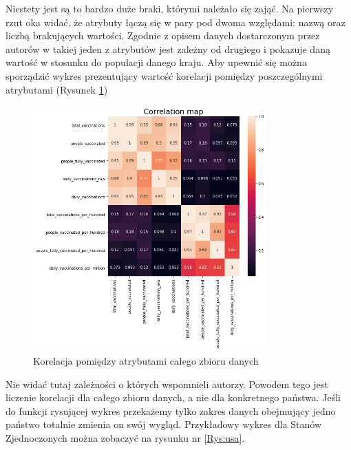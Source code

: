 \documentclass[12pt, oneside]{article}
\begin{document}
Niestety jest są to bardzo duże braki, którymi należało się zająć. Na pierwszy rzut oka widać, że atrybuty łączą się w pary pod dwoma względami: nazwą oraz liczbą brakujących wartości. Zgodnie z opisem danych dostarczonym przez autorów w takiej jeden z atrybutów jest zależny od drugiego i pokazuje daną wartość w stosunku do populacji danego kraju. Aby upewnić się można sporządzić wykres prezentujący wartość korelacji pomiędzy poszczególnymi atrybutami (Rysunek \ref{Rys:cor})

\begin{figure}[h]
\centering
\includegraphics[width=0.8\textwidth]{../img/corelation.png} 
\caption{Korelacja pomiędzy atrybutami całego zbioru danych\label{Rys:cor}}

\end{figure}

Nie widać tutaj zależności o których wspomnieli autorzy. Powodem tego jest liczenie korelacji dla całego zbioru danych, a nie dla konkretnego państwa. Jeśli do funkcji rysującej wykres przekażemy tylko zakres danych obejmujący jedno państwo totalnie zmienia on swój wygląd. Przykładowy wykres dla Stanów Zjednoczonych można zobaczyć na rysunku nr \ref{Rys:usa}.
\end{document}
